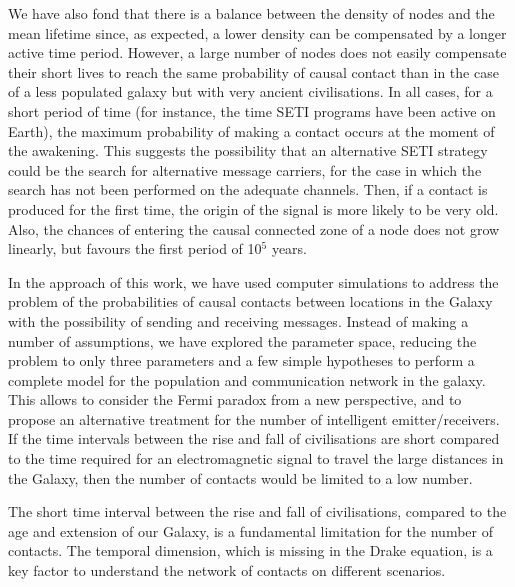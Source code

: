 \documentclass[crop]{CSLB}
\newcommand{\ceti}{node}
\newcommand{\cetis}{nodes}
\begin{document}
We have also fond that there is a balance between the density of
\cetis{} and the mean lifetime since, as expected, a lower density can
be compensated by a longer active time period.
%
However, a large number of nodes does not easily compensate their
short lives to reach the same probability of causal contact than in
the case of a less populated galaxy but with very ancient
civilisations.
%
In all cases, for a short period of time (for instance, the time SETI
programs have been active on Earth), the maximum probability of making
a contact occurs at the moment of the awakening.
%
This suggests the possibility that an alternative SETI strategy could
be the search for alternative message carriers, for the case in which
the search has not been performed on the adequate channels.
%
Then, if a contact is produced for the first time, the origin of the
signal is more likely to be very old.
%
Also, the chances of entering the causal connected zone of a \ceti{}
does not grow linearly, but favours the first period of 10$^5$ years.



In the approach of this work, we have used computer simulations to
address the problem of the probabilities of causal contacts between
locations in the Galaxy with the possibility of sending and receiving
messages.
%
Instead of making a number of assumptions, we have explored the
parameter space, reducing the problem to only three parameters and a
few simple hypotheses to perform a complete model for the population
and communication network in the galaxy.
%
This allows to consider the Fermi paradox from a new perspective, and
to propose an alternative treatment for the number of intelligent
emitter/receivers.
%
If the time intervals between the rise and fall of civilisations are
short compared to the time required for an electromagnetic signal to
travel the large distances in the Galaxy, then the number of contacts
would be limited to a low number.



The short time interval between the rise and fall of civilisations,
compared to the age and extension of our Galaxy, is a fundamental
limitation for the number of contacts.
%
The temporal dimension, which is missing in the Drake equation, is a
key factor to understand the network of contacts on different
scenarios.


\end{document}
